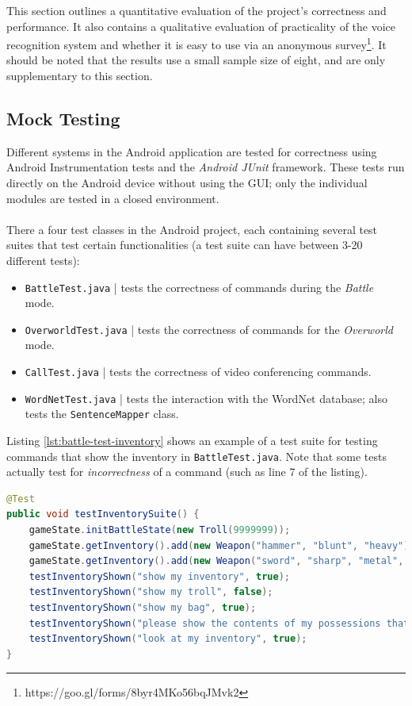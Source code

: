 \documentclass[11pt]{article}
\begin{document}
This section outlines a quantitative evaluation of the project's correctness and performance. It also contains a qualitative evaluation of practicality of the voice recognition system and whether it is easy to use via an anonymous survey\footnote{https://goo.gl/forms/8byr4MKo56bqJMvk2}. It should be noted that the results use a small sample size of eight, and are only supplementary to this section.

\subsection{Mock Testing}
\label{section:mock-testing}

Different systems in the Android application are tested for correctness using Android Instrumentation tests and the \textit{Android JUnit} framework. These tests run directly on the Android device without using the GUI; only the individual modules are tested in a closed environment.
\\
\\
There a four test classes in the Android project, each containing several test suites that test certain functionalities (a test suite can have between 3-20 different tests):

\begin{itemize}
\item \texttt{BattleTest.java} | tests the correctness of commands during the \textit{Battle} mode.

\item \texttt{OverworldTest.java} | tests the correctness of commands for the \textit{Overworld} mode.

\item \texttt{CallTest.java} | tests the correctness of video conferencing commands.

\item \texttt{WordNetTest.java} | tests the interaction with the WordNet database; also tests the \texttt{SentenceMapper} class. 
\end{itemize}

Listing \ref{lst:battle-test-inventory} shows an example of a test suite for testing commands that show the inventory in \texttt{BattleTest.java}. Note that some tests actually test for \textit{incorrectness} of a command (such as line 7 of the listing).

\begin{lstlisting}[language=Java, label=lst:battle-test-inventory]
@Test
public void testInventorySuite() {
    gameState.initBattleState(new Troll(9999999));
    gameState.getInventory().add(new Weapon("hammer", "blunt", "heavy"));
    gameState.getInventory().add(new Weapon("sword", "sharp", "metal", "pointy"));
    testInventoryShown("show my inventory", true);
    testInventoryShown("show my troll", false);
    testInventoryShown("show my bag", true);
    testInventoryShown("please show the contents of my possessions that I have", true);
    testInventoryShown("look at my inventory", true);
}
\end{lstlisting}
\end{document}
